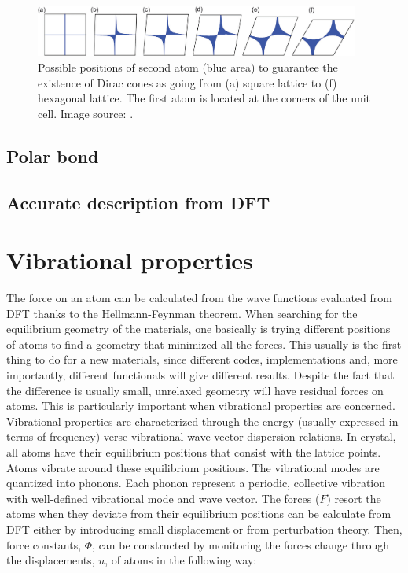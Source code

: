 \begin{figure}[htbp!] 
\centering  
\includegraphics[width=0.95\textwidth]{dirac_hs.png}
\caption{Possible positions of second atom (blue area) to guarantee the existence of Dirac cones as going from (a) square lattice to (f) hexagonal lattice. The first atom is located at the corners of the unit cell. Image source: \cite{Liu2013}. }  
\label{fig:dirac_hs}
\end{figure} 


\subsection{Polar bond}

\subsection{Accurate description from DFT}

\section{Vibrational properties}

The force on an atom can be calculated from the wave functions evaluated from DFT thanks to the Hellmann-Feynman theorem. When searching for the equilibrium geometry of the materials, one basically is trying different positions of atoms to find a geometry that minimized all the forces. This usually is the first thing to do for a new materials, since different codes, implementations and, more importantly, different functionals will give different results. Despite the fact that the difference is usually small, unrelaxed geometry will have residual forces on atoms. This is particularly important when vibrational properties are concerned. Vibrational properties are characterized through the energy (usually expressed in terms of frequency) verse vibrational wave vector dispersion relations.  In crystal,  all atoms have their equilibrium positions that consist with the lattice points. Atoms vibrate around these equilibrium positions. The vibrational modes are quantized into phonons. Each phonon represent a periodic, collective vibration with well-defined vibrational mode and wave vector. The forces ($F$) resort the atoms when they deviate from their equilibrium positions can be calculate from DFT either by introducing small displacement or from perturbation theory. Then, force constants, $\Phi$, can be constructed by monitoring the forces change through the displacements, $u$, of atoms in the following way:

